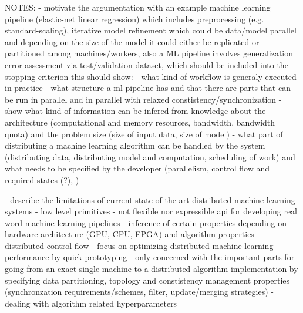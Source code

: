 NOTES:
- motivate the argumentation with an example machine learning pipeline (elastic-net linear regression) which includes preprocessing (e.g. standard-scaling), iterative model refinement which could be data/model parallel and depending on the size of the model it could either be replicated or partitioned among machines/workers, also a ML pipeline involves generalization error assessment via test/validation dataset, which should be included into the stopping criterion
this should show:
	- what kind of workflow is generaly executed in practice
	- what structure a ml pipeline has and that there are parts that can be run in parallel and in parallel with relaxed constistency/synchronization
	- show what kind of information can be infered from knowledge about the architecture (computational and memory resources, bandwidth, bandwidth quota) and the problem size (size of input data, size of model)
	- what part of distributing a machine learning algorithm can be handled by the system (distributing data, distributing model and computation, scheduling of work) and what needs to be specified by the developer (parallelism, control flow and required states (?), )

- describe the limitations of current state-of-the-art distributed machine learning systems
	- low level primitives
	- not flexible nor expressible api for developing real word machine learning pipelines
	- inference of certain properties depending on hardware architecture (GPU, CPU, FPGA) and algorithm properties
	- distributed control flow
	- focus on optimizing distributed machine learning performance by quick prototyping
	- only concerned with the important parts for going from an exact single machine to a distributed algorithm implementation by specifying data partitioning, topology and constistency management properties (synchronzation requirements/schemes, filter, update/merging strategies)
	- dealing with algorithm related hyperparameters
